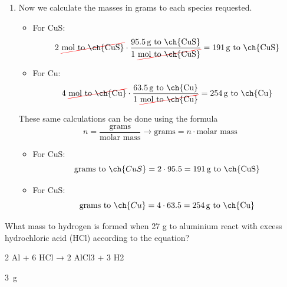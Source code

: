 \begin{example}
\begin{enumerate}[label=\numberballmDarkTeal]
\begin{itemize}
\begin{equation*}
                \end{equation*}
            \end{itemize}
            \item Now we calculate the masses in grams to each species requested.
            \begin{itemize}
                \item For CuS:
                \begin{equation*}
                    2\ \cancelred{\unit{\mol}\ \text{to \ch{CuS}}} \cdot \dfrac{\qty{95.5}{\g}\ \text{to \ch{CuS}}}{1\ \cancelred{\unit{\mole} \ \text{to \ch{CuS}}}} = \qty{191}{\g}\ \text{to \ch{CuS}}
                \end{equation*}
                \item For Cu:
                \begin{equation*}
                    4\ \cancelred{\unit{\mol}\ \text{to \ch{Cu}}} \cdot \dfrac{\qty{63.5}{\g}\ \text{to \ch{Cu}}}{1\ \cancelred{\unit{\mole} \ \text{to \ch{Cu}}}} = \qty{254}{\g}\ \text{to \ch{Cu}}
                \end{equation*}
            \end{itemize}
            These same calculations can be done using the formula
            \begin{equation*}
                n = \dfrac{\text{grams}}{\text{molar mass}} \longrightarrow \text{grams} = n \cdot \text{molar mass}
            \end{equation*}
            \begin{itemize}
                \item For CuS:
                \begin{equation*}
                    \text{grams to } \ch{CuS} = 2\cdot 95.5 = \qty{191}{\g}\ \text{to \ch{CuS}}
                \end{equation*}
                \item For CuS:
                \begin{equation*}
                    \text{grams to } \ch{Cu} = 4\cdot 63.5 = \qty{254}{\g}\ \text{to \ch{Cu}}
                \end{equation*}
            \end{itemize}
    \end{enumerate}
\end{example}



\begin{exercise}
    What mass to hydrogen is formed when 27 g to aluminium react with excess hydrochloric acid (HCl) according to the equation?
    \begin{reaction*}
        2 Al + 6 HCl → 2 AlCl3 + 3 H2
    \end{reaction*}

    \begin{solu}
        \qty{3}{\g}
    \end{solu}
\end{exercise}

